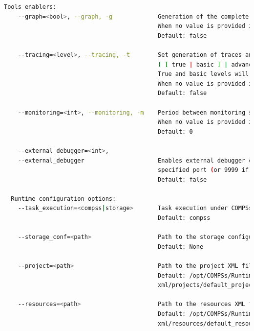 \begin{lstlisting}[language=bash]
  Tools enablers:
    --graph=<bool>, --graph, -g             Generation of the complete graph (true/false)
                                            When no value is provided it is set to true
                                            Default: false
                                            
    --tracing=<level>, --tracing, -t        Set generation of traces and/or tracing level
                                            ( [ true | basic ] | advanced | false)
                                            True and basic levels will produce the same traces.
                                            When no value is provided it is set to true
                                            Default: false
                                            
    --monitoring=<int>, --monitoring, -m    Period between monitoring samples (milliseconds)
                                            When no value is provided it is set to 2000
                                            Default: 0
                                            
    --external_debugger=<int>,
    --external_debugger                     Enables external debugger connection on the 
                                            specified port (or 9999 if empty)
                                            Default: false

  Runtime configuration options:
    --task_execution=<compss|storage>       Task execution under COMPSs or Storage.
                                            Default: compss
                                            
    --storage_conf=<path>                   Path to the storage configuration file
                                            Default: None
                                            
    --project=<path>                        Path to the project XML file
                                            Default: /opt/COMPSs/Runtime/configuration/
                                            xml/projects/default_project.xml
                                            
    --resources=<path>                      Path to the resources XML file
                                            Default: /opt/COMPSs/Runtime/configuration/
                                            xml/resources/default_resources.xml  
                                            

\end{lstlisting}
